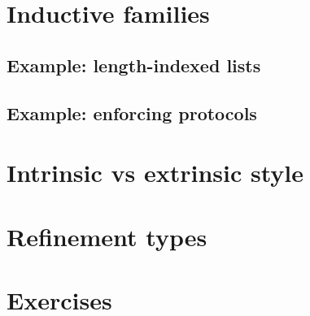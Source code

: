 \documentclass{beamer}
\begin{document}
\section{Inductive families}

\subsection{Example: length-indexed lists}

\subsection{Example: enforcing protocols}

\section{Intrinsic vs extrinsic style}

\section{Refinement types}

\section{Exercises}
\end{document}
